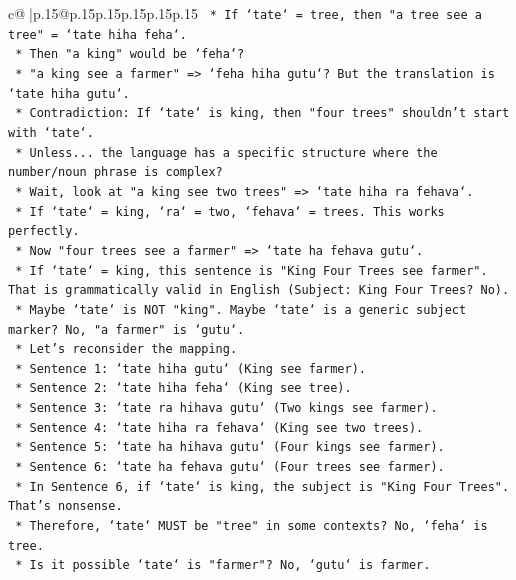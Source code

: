 \documentclass{article}
\begin{document}
{\begin{supertabular}{c@{$\;$}|p{.15\linewidth}@{}p{.15\linewidth}p{.15\linewidth}p{.15\linewidth}p{.15\linewidth}p{.15\linewidth}}
{{{\texttt{        *   If `tate` = tree, then "a tree see a tree" = `tate hiha feha`.} \\
\texttt{        *   Then "a king" would be `feha`?} \\
\texttt{        *   "a king see a farmer" => `feha hiha gutu`? But the translation is `tate hiha gutu`.} \\
\texttt{        *   Contradiction: If `tate` is king, then "four trees" shouldn't start with `tate`.} \\
\texttt{        *   Unless... the language has a specific structure where the number/noun phrase is complex?} \\
\texttt{        *   Wait, look at "a king see two trees" => `tate hiha ra fehava`.} \\
\texttt{        *   If `tate` = king, `ra` = two, `fehava` = trees. This works perfectly.} \\
\texttt{        *   Now "four trees see a farmer" => `tate ha fehava gutu`.} \\
\texttt{        *   If `tate` = king, this sentence is "King Four Trees see farmer". That is grammatically valid in English (Subject: King Four Trees? No).} \\
\texttt{        *   Maybe `tate` is NOT "king". Maybe `tate` is a generic subject marker? No, "a farmer" is `gutu`.} \\
\texttt{        *   Let's reconsider the mapping.} \\
\texttt{        *   Sentence 1: `tate hiha gutu` (King see farmer).} \\
\texttt{        *   Sentence 2: `tate hiha feha` (King see tree).} \\
\texttt{        *   Sentence 3: `tate ra hihava gutu` (Two kings see farmer).} \\
\texttt{        *   Sentence 4: `tate hiha ra fehava` (King see two trees).} \\
\texttt{        *   Sentence 5: `tate ha hihava gutu` (Four kings see farmer).} \\
\texttt{        *   Sentence 6: `tate ha fehava gutu` (Four trees see farmer).} \\
\texttt{        *   In Sentence 6, if `tate` is king, the subject is "King Four Trees". That's nonsense.} \\
\texttt{        *   Therefore, `tate` MUST be "tree" in some contexts? No, `feha` is tree.} \\
\texttt{        *   Is it possible `tate` is "farmer"? No, `gutu` is farmer.} \\
}}}
\end{supertabular}}
\end{document}
